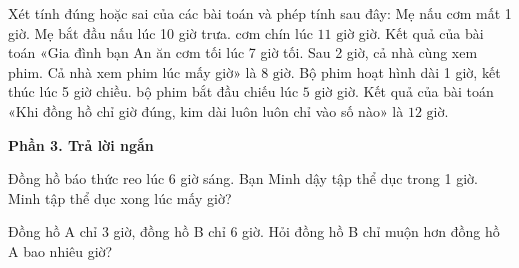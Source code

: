 \begin{ex} %
Xét tính đúng hoặc sai của các bài toán và phép tính sau đây:
\choiceTF
{\True Mẹ nấu cơm mất 1 giờ. Mẹ bắt đầu nấu lúc 10 giờ trưa. cơm chín lúc $11\text{ giờ}$ giờ.}
{Kết quả của bài toán «Gia đình bạn An ăn cơm tối lúc 7 giờ tối. Sau 2 giờ, cả nhà cùng xem phim. Cả nhà xem phim lúc mấy giờ» là $8\text{ giờ}$.}
{Bộ phim hoạt hình dài 1 giờ, kết thúc lúc 5 giờ chiều. bộ phim bắt đầu chiếu lúc $5\text{ giờ}$ giờ.}
{\True Kết quả của bài toán «Khi đồng hồ chỉ giờ đúng, kim dài luôn luôn chỉ vào số nào» là $12\text{ giờ}$.}
\end{ex}

\textbf{Phần 3. Trả lời ngắn}

\begin{ex} %
Đồng hồ báo thức reo lúc 6 giờ sáng. Bạn Minh dậy tập thể dục trong 1 giờ. Minh tập thể dục xong lúc mấy giờ?
\end{ex}

\begin{ex} %
Đồng hồ A chỉ 3 giờ, đồng hồ B chỉ 6 giờ. Hỏi đồng hồ B chỉ muộn hơn đồng hồ A bao nhiêu giờ?
\end{ex}

